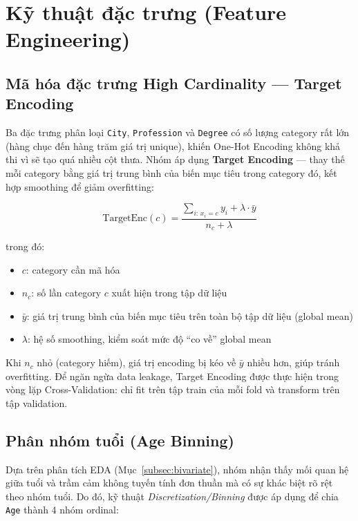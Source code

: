 \section{Kỹ thuật đặc trưng (Feature Engineering)}
\label{sec:feature_eng}

\subsection{Mã hóa đặc trưng High Cardinality --- Target Encoding}
\label{subsec:target_encoding}

Ba đặc trưng phân loại \texttt{City}, \texttt{Profession} và \texttt{Degree} có số lượng category rất lớn (hàng chục đến hàng trăm giá trị unique), khiến One-Hot Encoding không khả thi vì sẽ tạo quá nhiều cột thưa. Nhóm áp dụng \textbf{Target Encoding} --- thay thế mỗi category bằng giá trị trung bình của biến mục tiêu trong category đó, kết hợp smoothing để giảm overfitting:

\begin{equation}
\text{TargetEnc}(c) = \frac{\displaystyle\sum_{i:\, x_i = c} y_i + \lambda \cdot \bar{y}}{n_c + \lambda}
\label{eq:target_encoding}
\end{equation}

trong đó:
\begin{itemize}[noitemsep]
    \item $c$: category cần mã hóa
    \item $n_c$: số lần category $c$ xuất hiện trong tập dữ liệu
    \item $\bar{y}$: giá trị trung bình của biến mục tiêu trên toàn bộ tập dữ liệu (global mean)
    \item $\lambda$: hệ số smoothing, kiểm soát mức độ ``co về'' global mean
\end{itemize}

Khi $n_c$ nhỏ (category hiếm), giá trị encoding bị kéo về $\bar{y}$ nhiều hơn, giúp tránh overfitting. Để ngăn ngừa data leakage, Target Encoding được thực hiện trong vòng lặp Cross-Validation: chỉ fit trên tập train của mỗi fold và transform trên tập validation.

\subsection{Phân nhóm tuổi (Age Binning)}
\label{subsec:age_binning}

Dựa trên phân tích EDA (Mục~\ref{subsec:bivariate}), nhóm nhận thấy mối quan hệ giữa tuổi và trầm cảm không tuyến tính đơn thuần mà có sự khác biệt rõ rệt theo nhóm tuổi. Do đó, kỹ thuật \textit{Discretization/Binning} được áp dụng để chia \texttt{Age} thành 4 nhóm ordinal:

